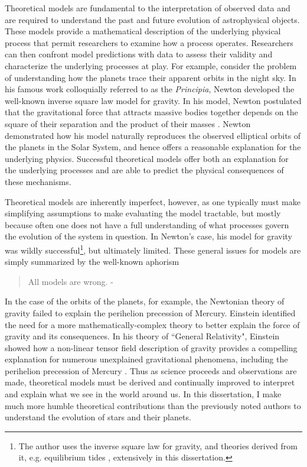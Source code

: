 Theoretical models are fundamental to the interpretation of observed data and are required to understand the past and future evolution of astrophysical objects. These models provide a mathematical description of the underlying physical process that permit researchers to examine how a process operates. Researchers can then confront model predictions with data to assess their validity and characterize the underlying processes at play. For example, consider the problem of understanding how the planets trace their apparent orbits in the night sky. In his famous work colloquially referred to as the \textit{Principia}, Newton developed the well-known inverse square law model for gravity. In his model, Newton postulated that the gravitational force that attracts massive bodies together depends on the square of their separation and the product of their masses \citep{Newton1687,Newton1999}. Newton demonstrated how his model naturally reproduces the observed elliptical orbits of the planets in the Solar System, and hence offers a reasonable explanation for the underlying physics. Successful theoretical models offer both an explanation for the underlying processes and are able to predict the physical consequences of these mechanisms.

Theoretical models are inherently imperfect, however, as one typically must make simplifying assumptions to make evaluating the model tractable, but mostly because often one does not have a full understanding of what processes govern the evolution of the system in question. In Newton's case, his model for gravity was wildly successful\footnote{The author uses the inverse square law for gravity, and theories derived from it, e.g. equilibrium tides \citep{Darwin1880}, extensively in this dissertation.}, but ultimately limited. These general issues for models are simply summarized by the well-known aphorism
\begin{quote}
All models are wrong. - \citet{Box1976}
\end{quote}

In the case of the orbits of the planets, for example, the Newtonian theory of gravity failed to explain the perihelion precession of Mercury. Einstein identified the need for a more mathematically-complex theory to better explain the force of gravity and its consequences. In his theory of ``General Relativity", Einstein showed how a non-linear tensor field description of gravity provides a compelling explanation for numerous unexplained gravitational phenomena, including the perihelion precession of Mercury \citep{Einstein1915b,Einstein1915a}. Thus as science proceeds and observations are made, theoretical models must be derived and continually improved to interpret and explain what we see in the world around us. In this dissertation, I make much more humble theoretical contributions than the previously noted authors to understand the evolution of stars and their planets.

